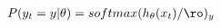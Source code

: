 \documentclass[preview]{standalone}
\begin{document}
\begin{align*}
P(y_t = y | \theta) = softmax(h_{\theta}(x_t)/\ro)_y
\end{align*}
\end{document}
